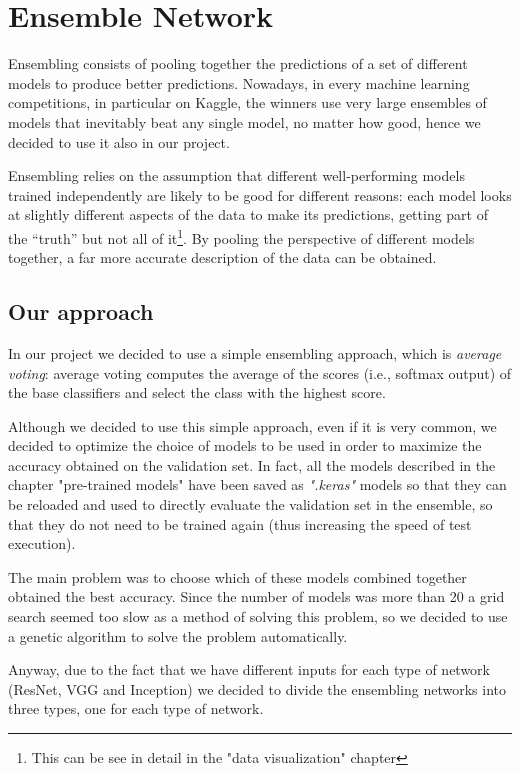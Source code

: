\section{Ensemble Network}
 Ensembling consists of pooling together the predictions of a set of different models to produce better predictions. Nowadays, in every machine learning competitions, in particular on Kaggle, the winners use very large ensembles of models that inevitably beat any single model, no matter how good, hence we decided to use it also in our project.
 
 
Ensembling relies on the assumption that different well-performing models trained independently are likely to be good for different reasons: each model looks at slightly different aspects of the data to make its predictions, getting part of the “truth” but not all of it\footnote{This can be see in detail in the "data visualization" chapter}. By pooling the perspective of different models together, a far more accurate description of the data can be obtained.

\subsection{Our approach}
In our project we decided to use a simple ensembling approach, which is \textit{average voting}: average voting computes the average of the scores (i.e., softmax output) of the base classifiers and select the class with the highest score.

Although we decided to use this simple approach, even if it is very common, we decided to optimize the choice of models to be used in order to maximize the accuracy obtained on the validation set. In fact, all the models described in the chapter "pre-trained models" have been saved as \textit{".keras"} models so that they can be reloaded and used to directly evaluate the validation set in the ensemble, so that they do not need to be trained again (thus increasing the speed of test execution).

The main problem was to choose which of these models combined together obtained the best accuracy. Since the number of models was more than 20 a grid search seemed too slow as a method of solving this problem, so we decided to use a genetic algorithm to solve the problem automatically.

Anyway, due to the fact that we have different inputs for each type of network (ResNet, VGG and Inception) we decided to divide the ensembling networks into three types, one for each type of network.

